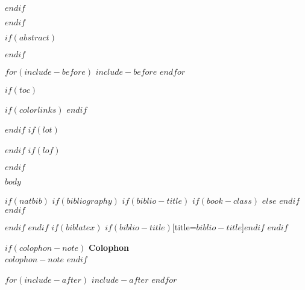 \documentclass[$if(fontsize)$$fontsize$,$endif$$if(lang)$$lang$,$endif$$if(papersize)$$papersize$,$endif$$for(classoption)$$classoption$$sep$,$endfor$]{$documentclass$}
\begin{document}
\thispagestyle{empty}

\par\vspace*{.35\textheight}{\centering $dedication$ \par}

\clearpage
\normalsize
\newpage

$endif$

\pagestyle{kjh}

\frontmatter
{} 
$endif$

$if(abstract)$
\begin{abstract}
\noindent $abstract$
\end{abstract}
$endif$

$for(include-before)$
$include-before$
$endfor$

$if(toc)$
{
$if(colorlinks)$
\hypersetup{linkcolor=$if(toccolor)$DarkSlateBlue$toccolor$$else$black$endif$}
$endif$
\setcounter{tocdepth}{$toc-depth$}
{\sffamily
\begin{KeepFromToc}  
  \tableofcontents
\end{KeepFromToc}  
}
}
$endif$
$if(lot)$
{\sffamily
  \listoftables
  }
$endif$
$if(lof)$
{\sffamily
  \listoffigures
  }
$endif$


$body$

\twocolumn

$if(natbib)$
$if(bibliography)$
$if(biblio-title)$
$if(book-class)$
\renewcommand\bibname{$biblio-title$}
$else$
\renewcommand\refname{$biblio-title$}
$endif$
$endif$


$endif$
$endif$
$if(biblatex)$
\printbibliography$if(biblio-title)$[title=$biblio-title$]$endif$
$endif$



$if(colophon-note)$
\clearpage
\newpage
\onecolumn
\normalsize
\thispagestyle{empty}
{\sffamily\bfseries\color{pagesectioning} Colophon} \\
\smallskip
$colophon-note$
$endif$

$for(include-after)$
$include-after$
$endfor$
\end{document}

